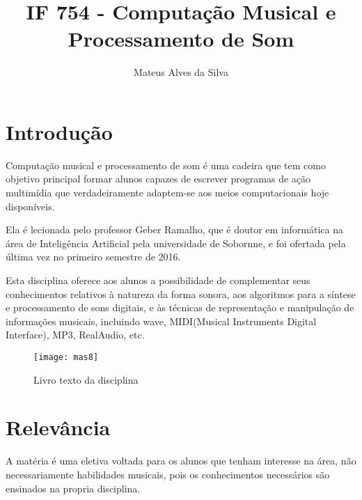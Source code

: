 \documentclass{article}
\title{IF 754 - Computação Musical e Processamento de Som}
\author{Mateus Alves da Silva}
\date{}
\begin{document}
\maketitle

\section{Introdução}
Computação musical e processamento de som é uma cadeira que tem como objetivo principal formar alunos capazes de escrever programas de ação multimídia que verdadeiramente adaptem-se aos meios computacionais hoje disponíveis. 

Ela é lecionada pelo professor Geber Ramalho, que é doutor em informática na área de Inteligência Artificial pela universidade de Sobornne, e foi ofertada pela última vez no primeiro semestre de 2016.  \citep{sitedoprof}

Esta disciplina oferece aos alunos a possibilidade de complementar seus conhecimentos relativos à natureza da forma sonora, aos algoritmos para a síntese e processamento de sons digitais, e às técnicas de representação e manipulação de informações  musicais, incluindo wave, MIDI(Musical Instruments Digital Interface), MP3, RealAudio, etc.

\begin{figure}[h!]
\centering
\texttt{[image: mas8]}
\caption{Livro texto da disciplina \citep{livro}}
\label{fig:livrotexto}
\end{figure}

\section{Relevância \citep{infodacadeira}}
A matéria é uma eletiva voltada para  os alunos que tenham interesse na área, não necessariamente habilidades musicais, pois os conhecimentos necessários são ensinados na propria disciplina.
\end{document}
